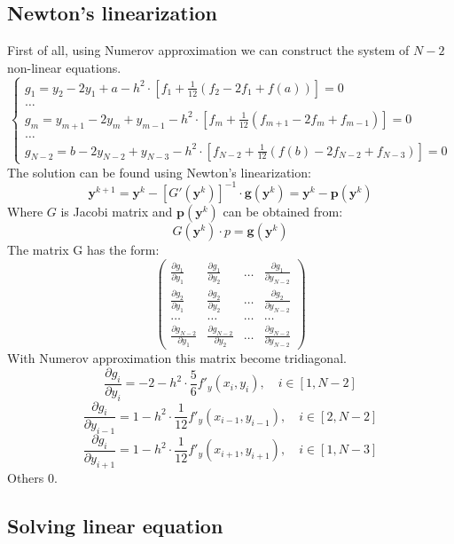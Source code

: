 \documentclass[12pt, letterpaper]{article}
\begin{document}
	\subsection{Newton's linearization}
	First of all, using Numerov approximation we can construct the system of $N-2$ non-linear equations.
	\begin{equation}\label{ODY}
	\begin{cases}
	g_1 = y_2 - 2 y_1 + a - h^2 \cdot [f_1 + \frac{1}{12}(f_2 - 2f_1 + f(a))] = 0	 \\
	\dots \\
	g_m = y_{m+1} - 2 y_m + y_{m-1} - h^2 \cdot [f_m + \frac{1}{12}(f_{m+1} - 2f_m + f_{m-1})] = 0\\
	\dots \\
	g_{N-2} = b - 2 y_{N-2} + y_{N-3} - h^2 \cdot [f_{N-2} + \frac{1}{12}(f(b) - 2f_{N-2} + f_{N-3})] = 0
	\end{cases}	
	\end{equation}
	The solution can be found using Newton's linearization:
	\begin{equation}
	\textbf{y}^{k+1} = \textbf{y}^k - [G'(\textbf{y}^{k})]^{-1} \cdot \textbf{g}(\textbf{y}^{k}) = \textbf{y}^k - \textbf{p}(\textbf{y}^k) 
	\end{equation}
	Where $G$ is Jacobi matrix and $\textbf{p}(\textbf{y}^k)$ can be obtained from:
	\begin{equation}
		G(\textbf{y}^k)\cdot p = \textbf{g}(\textbf{y}^k) 
	\end{equation}
	The matrix G has the form:
	\begin{equation}
	\begin{pmatrix}
	\frac{\partial g_1}{\partial y_1}& \frac{\partial g_1}{\partial y_2}& \dots & \frac{\partial g_1}{\partial y_{N-2}}\\
	\frac{\partial g_2}{\partial y_1}& \frac{\partial g_2}{\partial y_2}& \dots & \frac{\partial g_2}{\partial y_{N-2}}\\
	\dots & \dots & \dots & \dots\\
\frac{\partial g_{N-2}}{\partial y_1}& \frac{\partial g_{N-2}}{\partial y_2}& \dots& 				\frac{\partial g_{N-2}}{\partial y_{N-2}}
	\end{pmatrix}
	\end{equation}
	With Numerov approximation this matrix become tridiagonal.
	\begin{equation}
	\frac{\partial g_i}{\partial y_i} = -2 - h^2 \cdot \frac{5}{6}f'_y(x_i, y_i)
	, \quad i \in [1, N-2]	
	\end{equation}
	\begin{equation}
	\frac{\partial g_{i}}{\partial y_{i-1}} = 1 - h^2 \cdot \frac{1}{12}f'_y(x_{i-1}, y_{i-1})	, \quad i \in [2, N-2]
	\end{equation}
	\begin{equation}
	\frac{\partial g_{i}}{\partial y_{i+1}} = 1 - h^2 \cdot \frac{1}{12}f'_y(x_{i+1}, y_{i+1}), \quad i \in [1, N-3]
	\end{equation}
	Others 0.
	\subsection{Solving linear equation}
	
	
\end{document}
